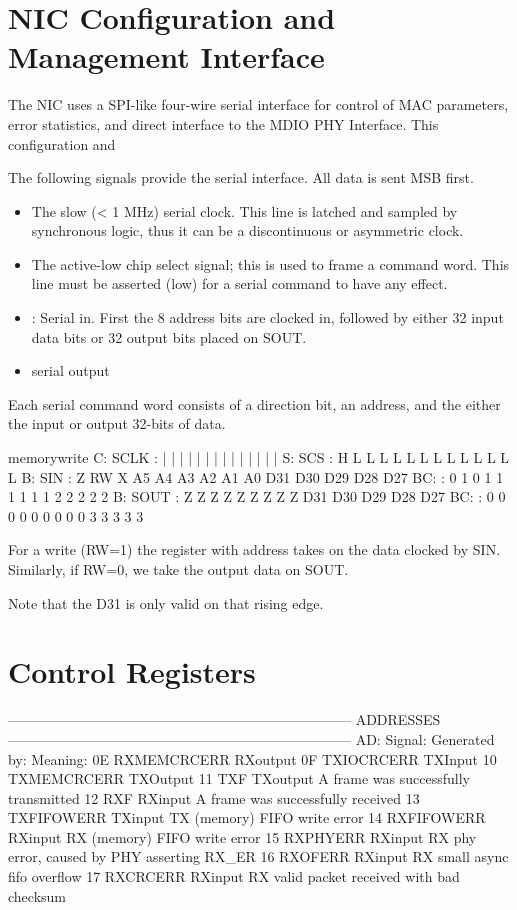 \section{NIC Configuration and Management Interface}
The NIC uses a SPI-like four-wire serial interface for control of MAC parameters, error statistics, and direct interface to the MDIO PHY Interface. This configuration and 


The following signals provide the serial interface. All data is sent MSB first. 
\begin{itemize}
\item {} The slow (< 1 MHz) serial clock. This line is latched and sampled by synchronous logic, thus it can be a discontinuous or asymmetric clock.
\item {} The active-low chip select signal; this is used to frame a command word. This line must be asserted (low) for a serial command to have any effect. 
\item {} : Serial in. First the 8 address bits are clocked in, followed by either 32 input data bits or 32 output bits placed on SOUT.
\item {} serial output
\end{itemize}

Each serial command word consists of a direction bit, an address, and the either the input or output 32-bits of data. 


\begin{timing}{memorywrite}
C: SCLK    :  |  |  |  |  |  |  |  |  |  |   |   |   |   |  
S: SCS     :  H  L  L  L  L  L  L  L  L  L   L   L   L   L  
B: SIN     :  Z  RW X  A5 A4 A3 A2 A1 A0 D31 D30 D29 D28 D27 
BC:        :  0  1  0  1  1  1  1  1  1  2   2   2   2   2
B: SOUT    :  Z  Z  Z  Z  Z  Z  Z  Z  Z  D31 D30 D29 D28 D27
BC:        :  0  0  0  0  0  0  0  0  0  3   3   3   3   3 
\end{timing}

For a write (RW=1) the register with address  takes on the data clocked by SIN. Similarly, if RW=0, we take the output data on SOUT. 

Note that the D31 is only valid on that rising edge. 

\section{Control Registers}

--------------------------------------------------------------------------
ADDRESSES
--------------------------------------------------------------------------
AD: Signal:     Generated by:  Meaning:
0E  RXMEMCRCERR RXoutput       
0F  TXIOCRCERR  TXInput
10  TXMEMCRCERR TXOutput         
11  TXF         TXoutput        A frame was successfully transmitted 
12  RXF         RXinput         A frame was successfully received
13  TXFIFOWERR  TXinput         TX (memory) FIFO write error
14  RXFIFOWERR  RXinput         RX (memory) FIFO write error 
15  RXPHYERR    RXinput         RX phy error, caused by PHY asserting RX_ER
16  RXOFERR     RXinput         RX small async fifo overflow
17  RXCRCERR    RXinput         RX valid packet received with bad checksum


